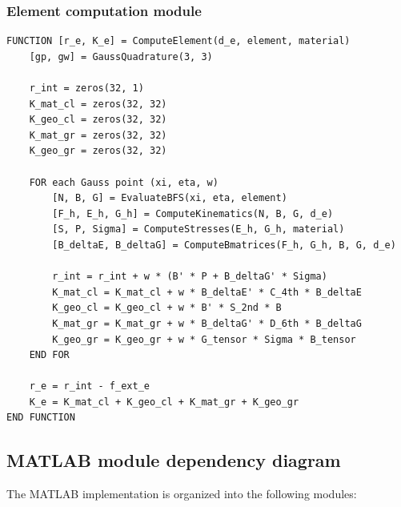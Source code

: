 \documentclass[11pt]{article}
\begin{document}
\subsubsection{Element computation module}
\begin{verbatim}
FUNCTION [r_e, K_e] = ComputeElement(d_e, element, material)
    [gp, gw] = GaussQuadrature(3, 3)

    r_int = zeros(32, 1)
    K_mat_cl = zeros(32, 32)
    K_geo_cl = zeros(32, 32)
    K_mat_gr = zeros(32, 32)
    K_geo_gr = zeros(32, 32)

    FOR each Gauss point (xi, eta, w)
        [N, B, G] = EvaluateBFS(xi, eta, element)
        [F_h, E_h, G_h] = ComputeKinematics(N, B, G, d_e)
        [S, P, Sigma] = ComputeStresses(E_h, G_h, material)
        [B_deltaE, B_deltaG] = ComputeBmatrices(F_h, G_h, B, G, d_e)

        r_int = r_int + w * (B' * P + B_deltaG' * Sigma)
        K_mat_cl = K_mat_cl + w * B_deltaE' * C_4th * B_deltaE
        K_geo_cl = K_geo_cl + w * B' * S_2nd * B
        K_mat_gr = K_mat_gr + w * B_deltaG' * D_6th * B_deltaG
        K_geo_gr = K_geo_gr + w * G_tensor * Sigma * B_tensor
    END FOR

    r_e = r_int - f_ext_e
    K_e = K_mat_cl + K_geo_cl + K_mat_gr + K_geo_gr
END FUNCTION
\end{verbatim}

\subsection{MATLAB module dependency diagram}
\label{ssec:modules}

The MATLAB implementation is organized into the following modules:
\end{document}
